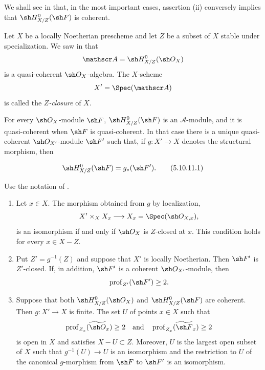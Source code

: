 We shall see in  that, in the most important
cases, assertion {\rm(ii)} conversely implies that
$\sh H^0_{X/Z}(\sh F)$ is coherent.

\begin{env}[5.10.11]
\label{IV.5.10.11}
Let $X$ be a locally Noetherian prescheme and let $Z$ be a subset
of $X$ stable under specialization.  We saw in 
that
\[
  \mathscr A=\sh H^0_{X/Z}(\sh O_X)
\]
is a quasi-coherent $\sh O_X$-algebra.  The $X$-scheme
\[
  X'=\Spec(\mathscr A)
\]
 is called the \emph{$Z$-closure} of $X$.

For every $\sh O_X$-module $\sh F$,
$\sh H^0_{X/Z}(\sh F)$ is an $\mathscr A$-module, and it is
quasi-coherent when $\sh F$ is quasi-coherent.  In that case there
is a unique quasi-coherent $\sh O_{X'}$-module $\sh F'$ such that,
if $g:X'\to X$ denotes the structural morphism, then
\end{env}

\begin{equation}
\label{IV.5.10.11.1}
  \sh H^0_{X/Z}(\sh F)=g_*(\sh F').
\tag{5.10.11.1}
\end{equation}

\begin{proposition}[5.10.12]
\label{IV.5.10.12}
Use the notation of .
\begin{enumerate}[{\rm(i)}]
  \item Let $x\in X$.  The morphism obtained from $g$ by
  localization,
  \[
    X'\times_X X_x\longrightarrow
    X_x=\Spec(\sh O_{X,x}),
  \]
  is an isomorphism if and only if $\sh O_X$ is $Z$-closed at
  $x$.  This condition holds for every $x\in X-Z$.

  \item Put $Z'=g^{-1}(Z)$ and suppose that $X'$ is locally
  Noetherian.  Then $\sh F'$ is $Z'$-closed.  If, in addition,
  $\sh F'$ is a coherent $\sh O_{X'}$-module, then
  \[
    \operatorname{prof}_{Z'}(\sh F')\geq2.
  \]

  \item Suppose that both
  $\sh H^0_{X/Z}(\sh O_X)$ and
  $\sh H^0_{X/Z}(\sh F)$ are coherent.  Then
  $g:X'\to X$ is finite.  The set $U$ of points $x\in X$ such
  that
  \[
    \operatorname{prof}_{Z_x}(\widetilde{\sh O}_x)\geq2
    \quad\text{and}\quad
    \operatorname{prof}_{Z_x}(\widetilde{\sh F}_x)\geq2
  \]
  is open in $X$ and satisfies $X-U\subset Z$.  Moreover, $U$ is
  the largest open subset of $X$ such that
  $g^{-1}(U)\to U$ is an isomorphism and the restriction to $U$
  of the canonical $g$-morphism from $\sh F$ to $\sh F'$ is an
  isomorphism.
\end{enumerate}
\end{proposition}

